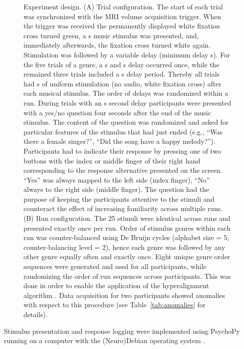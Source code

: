 \documentclass[10pt,a4paper,twocolumn]{article}
\begin{document}
\begin{figure}[t]
  \caption{
  Experiment design.
  (A) Trial configuration. The start of each trial was synchronized with the
  MRI volume acquisition trigger. When the trigger was received the permanently
  displayed white fixation cross turned green, a \unit[6]{s} music stimulus was
  presented, and, immediately afterwards, the fixation cross turned white
  again.
  Stimulation was followed by a variable delay (minimum delay \unit[4]{s}). For
  the five trials of a genre, a \unit[4]{s} and \unit[8]{s} delay occurred
  once, while the remained three trials included a \unit[6]{s} delay period.
  Thereby all trials had \unit[4-8]{s} of uniform stimulation (no audio, white
  fixation cross) after each musical stimulus.
  The order of delays was randomized within a run. During trials with an
  \unit[8]{s} second delay participants were presented with a yes/no question
  four seconds after the end of the music stimulus. The content of the question
  was randomized and asked for particular features of the stimulus that had
  just ended (e.g., ``Was there a female singer?'', ``Did the song have a happy
  melody?'').  Participants had to indicate their response by pressing one of
  two buttons with the index or middle finger of their right hand corresponding
  to the response alternative presented on the screen.  ``Yes'' was always
  mapped to the left side (index finger), ``No'' always to the right side
  (middle finger).  The question had the purpose of keeping the participants
  attentive to the stimuli and counteract the effect of increasing familiarity
  across multiple runs. 
  (B) Run configuration. The 25 stimuli were identical across runs and
  presented exactly once per run. Order of stimulus genres within each run was
  counter-balanced using De Bruijn cycles \cite{AMM+2011} (alphabet size = 5,
  counter-balancing level = 2), hence each genre was followed by any other
  genre equally often and exactly once.  Eight unique genre order sequences
  were generated and used for all participants, while randomizing the order of
  run sequences across participants. This was done in order to enable the
  application of the hyperalignment algorithm \cite{HGC+11}. Data acquisition
  for two participants showed anomalies with respect to this procedure (see
  Table~\ref{tab:anomalies} for details).
  }

  \label{fig:design}
\end{figure}

Stimulus presentation and response logging were implemented using PsychoPy
\cite{Pie2007}  running on a computer with the (Neuro)Debian operating system
\cite{HH12}.
\end{document}
